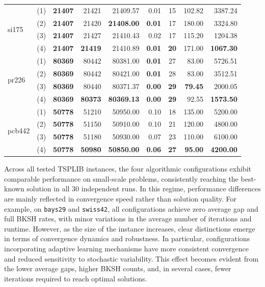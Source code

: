 \documentclass[runningheads]{llncs}
\begin{document}
{\begin{longtable}{l c r r r r c r r}
\midrule

\multirow{4}{*}{si175}
 & (1) & \textbf{21407} & 21421 & 21409.57 & 0.01 & 15 & 102.82 & 3387.24 \\
 & (2) & \textbf{21407} & 21420 & \textbf{21408.00} & \textbf{0.01} & 17 & 180.00 & 3324.80 \\
 & (3) & \textbf{21407} & 21427 & 21410.43 & 0.02 & 17 & 115.20 & 1204.38 \\
 & (4) & \textbf{21407} & \textbf{21419} & 21410.89 & \textbf{0.01} & \textbf{20} & 171.00 & \textbf{1067.30} \\

\midrule

\multirow{4}{*}{pr226}
 & (1) & \textbf{80369} & 80442 & 80381.00 & \textbf{0.01} & 27 & 83.00 & 5726.51 \\
 & (2) & \textbf{80369} & 80442 & 80421.00 & \textbf{0.01} & 28 & 83.00 & 3512.51 \\
 & (3) & \textbf{80369} & 80440 & 80371.37 & \textbf{0.00} & \textbf{29} & \textbf{79.45} & 2000.05 \\
 & (4) & \textbf{80369} & \textbf{80373} & \textbf{80369.13} & \textbf{0.00} & \textbf{29} & 92.55 & \textbf{1573.50} \\

 \midrule

\multirow{4}{*}{pcb442}
 & (1) & \textbf{50778} & 51210 & 50950.00 & 0.10 & 18 & 135.00 & 5200.00 \\
 & (2) & \textbf{50778} & 51150 & 50910.00 & 0.10 & 21 & 120.00 & 4800.00 \\
 & (3) & \textbf{50778} & 51180 & 50930.00 & 0.07 & 23 & 110.00 & 6100.00 \\
 & (4) & \textbf{50778} & \textbf{50980} & \textbf{50850.00} & \textbf{0.06} & \textbf{27} & \textbf{95.00} & \textbf{4200.00} \\


\end{longtable}
}

\noindent Across all tested TSPLIB instances, the four algorithmic configurations exhibit comparable performance on small-scale problems, consistently reaching the best-known solution in all 30 independent runs. In this regime, performance differences are mainly reflected in convergence speed rather than solution quality. For example, on \texttt{bays29} and \texttt{swiss42}, all configurations achieve zero average gap and full BKSH rates, with minor variations in the average number of iterations and runtime. However, as the size of the instance increases, clear distinctions emerge in terms of convergence dynamics and robustness. In particular, configurations incorporating adaptive learning mechanisms have more consistent convergence and reduced sensitivity to stochastic variability. This effect becomes evident from the lower average gaps, higher BKSH counts, and, in several cases, fewer iterations required to reach optimal solutions.
\end{document}
